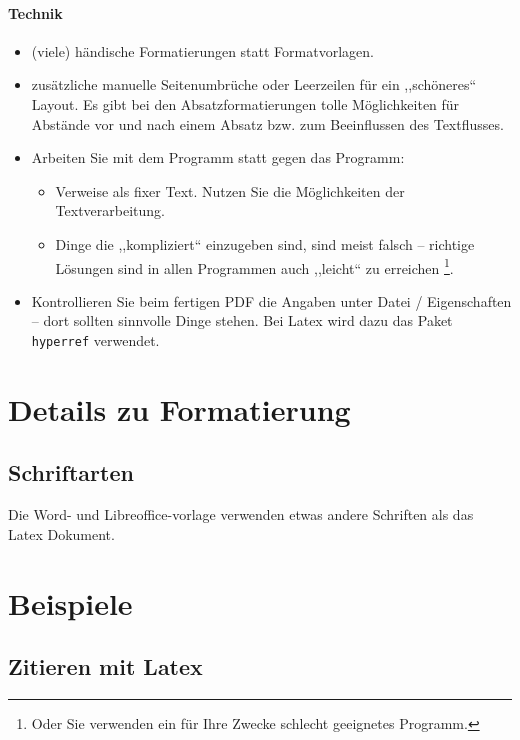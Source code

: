 \documentclass[a4paper,ngerman,naustrian,DIV=12,BCOR=1cm]{scrbook}
\newcommand{\code}[1]{\texttt{#1}}
\begin{document}
\paragraph{Technik}
\begin{itemize}
\item (viele) händische Formatierungen statt Formatvorlagen.
\item zusätzliche manuelle Seitenumbrüche oder Leerzeilen für ein ,,schöneres``
Layout. Es gibt bei den Absatzformatierungen tolle Möglichkeiten für
Abstände vor und nach einem Absatz bzw. zum Beeinflussen des Textflusses.
\item Arbeiten Sie mit dem Programm statt gegen das Programm:

\begin{itemize}
\item Verweise als fixer Text. Nutzen Sie die Möglichkeiten der Textverarbeitung.
\item Dinge die ,,kompliziert`` einzugeben sind, sind meist falsch --
richtige Lösungen sind in allen Programmen auch ,,leicht`` zu erreichen%
\footnote{Oder Sie verwenden ein für Ihre Zwecke schlecht geeignetes Programm.%
}.
\end{itemize}
\item Kontrollieren Sie beim fertigen PDF die Angaben unter Datei / Eigenschaften
-- dort sollten sinnvolle Dinge stehen. Bei Latex wird dazu das Paket
\texttt{\code{\texttt{hyperref}}} verwendet.
\end{itemize}

\section{Details zu Formatierung}


\subsection{Schriftarten}

Die Word- und Libreoffice-vorlage verwenden etwas andere Schriften
als das Latex Dokument.


\section{Beispiele}


\subsection{Zitieren mit Latex}
\end{document}

